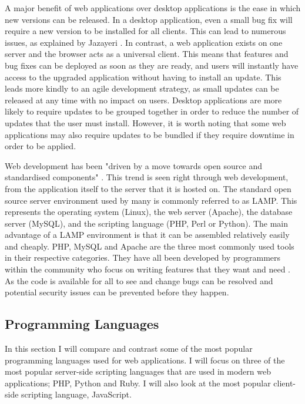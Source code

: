 \documentclass[authoryearcitations]{UoYCSproject}
\begin{document}
A major benefit of web applications over desktop applications is the ease in which new versions can be released. In a desktop application, even a small bug fix will require a new version to be installed for all clients. This can lead to numerous issues, as explained by Jazayeri \citep{Jazayeri2007}. In contrast, a web application exists on one server and the browser acts as a universal client. This means that features and bug fixes can be deployed as soon as they are ready, and users will instantly have access to the upgraded application without having to install an update. This leads more kindly to an agile development strategy, as small updates can be released at any time with no impact on users. Desktop applications are more likely to require updates to be grouped together in order to reduce the number of updates that the user must install. However, it is worth noting that some web applications may also require updates to be bundled if they require downtime in order to be applied.  

Web development has been "driven by a move towards open source and standardised components" \citep{Jazayeri2007}. This trend is seen right through web development, from the application itself to the server that it is hosted on. The standard open source server environment used by many is commonly referred to as LAMP. This represents the operating system (Linux), the web server (Apache), the database server (MySQL), and the scripting language (PHP, Perl or Python). The main advantage of a  LAMP environment is that it can be assembled relatively easily and cheaply. PHP, MySQL and Apache are the three most commonly used tools in their respective categories. They have all been developed by programmers within the community who focus on writing features that they want and need \citep{Nixon2009}. As the code is available for all to see and change bugs can be resolved and potential security issues can be prevented before they happen.


\subsection{Programming Languages}

In this section I will compare and contrast some of the most popular programming languages used for web applications. I will focus on three of the most popular server-side scripting languages that are used in modern web applications; PHP, Python and Ruby. I will also look at the most popular client-side scripting language, JavaScript.
\end{document}
